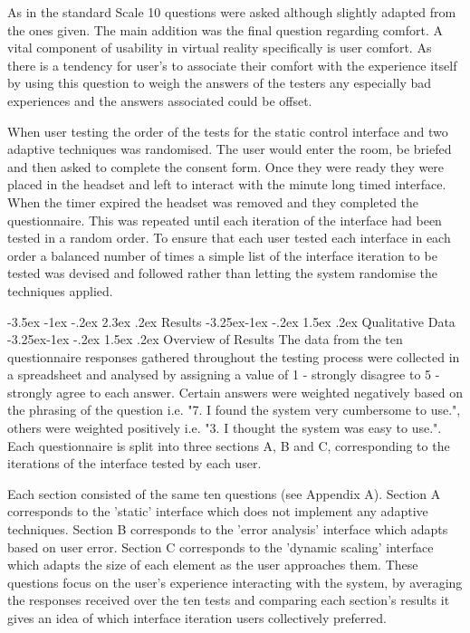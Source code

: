 \documentclass[12pt]{article}
\makeatletter
\renewcommand{\section}{\@startsection {section}{1}{\z@}%
             {-3.5ex \@plus -1ex \@minus -.2ex}%
             {2.3ex \@plus .2ex}%
             {\normalfont\Large\scshape\bfseries}}
\renewcommand{\subsection}{\@startsection{subsection}{2}{\z@}%
             {-3.25ex\@plus -1ex \@minus -.2ex}%
             {1.5ex \@plus .2ex}%
             {\normalfont\large\scshape\bfseries}}
\renewcommand{\subsubsection}{\@startsection{subsubsection}{2}{\z@}%
             {-3.25ex\@plus -1ex \@minus -.2ex}%
             {1.5ex \@plus .2ex}%
             {\normalfont\normalsize\scshape\bfseries}}
\makeatother
\begin{document}
As in the standard Scale 10 questions were asked although slightly adapted from the ones given. The main addition was the final question regarding comfort. A vital component of usability in virtual reality specifically is user comfort. As there is a tendency for user's to associate their comfort with the experience itself by using this question to weigh the answers of the testers any especially bad experiences and the answers associated could be offset.

When user testing the order of the tests for the static control interface and two adaptive techniques was randomised. The user would enter the room, be briefed and then asked to complete the consent form. Once they were ready they were placed in the headset and left to interact with the minute long timed interface. When the timer expired the headset was removed and they completed the questionnaire. This was repeated until each iteration of the interface had been tested in a random order. To ensure that each user tested each interface in each order a balanced number of times a simple list of the interface iteration to be tested was devised and followed rather than letting the system randomise the techniques applied.

\section{Results}
\subsection{Qualitative Data}
\subsubsection{Overview of Results}
The data from the ten questionnaire responses gathered throughout the testing process were collected in a spreadsheet and analysed by assigning a value of 1 - strongly disagree to 5 - strongly agree to each answer. Certain answers were weighted negatively based on the phrasing of the question i.e. "7. I found the system very cumbersome to use.", others were weighted positively i.e. "3. I thought the system was easy to use.". Each questionnaire is split into three sections A, B and C, corresponding to the iterations of the interface tested by each user. 

Each section consisted of the same ten questions (see Appendix A). Section A corresponds to the 'static' interface which does not implement any adaptive techniques. Section B corresponds to the 'error analysis' interface which adapts based on user error. Section C corresponds to the 'dynamic scaling' interface which adapts the size of each element as the user approaches them. These questions focus on the user's experience interacting with the system, by averaging the responses received over the ten tests and comparing each section's results it gives an idea of which interface iteration users collectively preferred.
\end{document}
